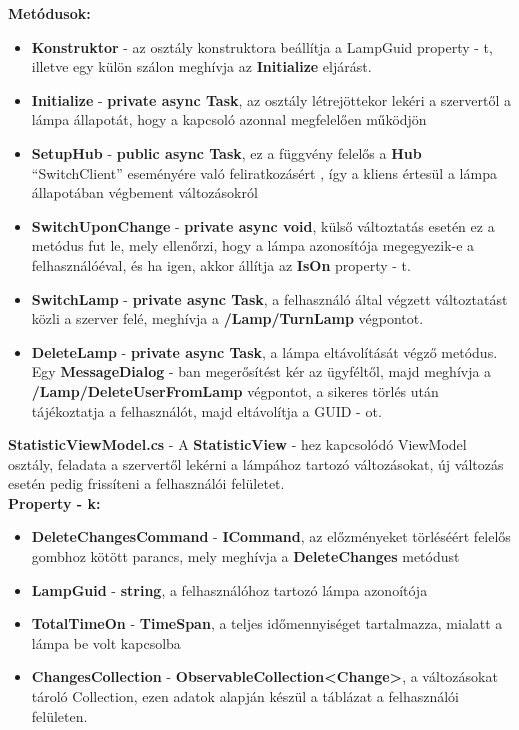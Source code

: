\documentclass[a4paper,12pt]{report}
\begin{document}
    \textbf{Metódusok:}

\begin{itemize}
    \item \textbf{Konstruktor} - az osztály konstruktora beállítja a LampGuid property - t, illetve egy külön szálon meghívja az \textbf{Initialize} eljárást.
    \item \textbf{Initialize} - \textbf{private async Task}, az osztály létrejöttekor lekéri a szervertől a lámpa állapotát, hogy a kapcsoló
    azonnal megfelelően működjön
    \item \textbf{SetupHub} - \textbf{public async Task}, ez a függvény felelős a \textbf{Hub} ``SwitchClient'' eseményére való feliratkozásért
    , így a kliens értesül a lámpa állapotában végbement változásokról
    \item \textbf{SwitchUponChange} - \textbf{private async void}, külső változtatás esetén ez a metódus fut le, mely ellenőrzi, hogy a lámpa
    azonosítója megegyezik-e a felhasználóéval, és ha igen, akkor állítja az \textbf{IsOn} property - t.
    \item \textbf{SwitchLamp} - \textbf{private async Task}, a felhasználó által végzett változtatást közli a szerver felé, meghívja a
    \textbf{/Lamp/TurnLamp} végpontot.
    \item \textbf{DeleteLamp} - \textbf{private async Task}, a lámpa eltávolítását végző metódus.  Egy \textbf{MessageDialog} - ban megerősítést
    kér az ügyféltől, majd meghívja a \textbf{/Lamp/DeleteUserFromLamp} végpontot, a sikeres törlés után tájékoztatja a felhasználót, majd
    eltávolítja a GUID - ot.
\end{itemize}

    \textbf{StatisticViewModel.cs} - A \textbf{StatisticView} - hez kapcsolódó ViewModel osztály, feladata a szervertől lekérni a lámpához
    tartozó változásokat, új változás esetén pedig frissíteni a felhasználói felületet.\\

    \textbf{Property - k:}

\begin{itemize}
    \item \textbf{DeleteChangesCommand} - \textbf{ICommand}, az előzményeket törléséért felelős gombhoz kötött parancs, mely meghívja a
    \textbf{DeleteChanges} metódust
    \item \textbf{LampGuid} - \textbf{string}, a felhasználóhoz tartozó lámpa azonoítója
    \item \textbf{TotalTimeOn} - \textbf{TimeSpan}, a teljes időmennyiséget tartalmazza, mialatt a lámpa be volt kapcsolba
    \item \textbf{ChangesCollection} - \textbf{ObservableCollection<Change>}, a változásokat tároló Collection, ezen adatok
    alapján készül a táblázat a felhasználói felületen.
\end{itemize}
\end{document}
